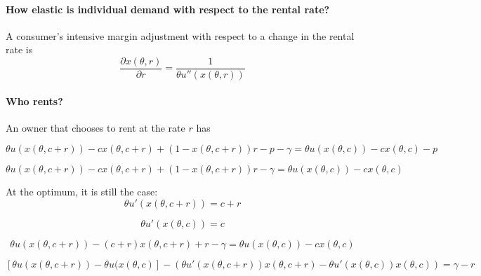 \documentclass[11pt]{article}
\begin{document}
\paragraph{How elastic is individual demand with respect to the rental rate?} 
A consumer's intensive margin adjustment with respect to a change in the rental rate is 
\begin{equation} 
\frac{\partial x(\theta, r)}{\partial r} = \frac{1}{\theta u''(x(\theta, r))}
\end{equation} 

\paragraph{Who rents?} 

An owner that chooses to rent at the rate $r$ has 

\begin{equation}
\theta u(x(\theta, c + r)) - c x(\theta, c + r) + (1-x(\theta, c+r))r
- p - \gamma =  
\theta u(x(\theta, c)) - c x(\theta, c) - p  
\end{equation} 

\begin{equation}
\theta u(x(\theta, c + r)) - c x(\theta, c + r) + (1-x(\theta, c+r))r - \gamma =  \theta u(x(\theta, c)) - c x(\theta, c)   
\end{equation} 


At the optimum, it is still the case: 
\begin{equation}
\theta u'(x(\theta, c + r)) = c + r
\end{equation} 

\begin{equation}
\theta u'(x(\theta, c)) = c
\end{equation} 

\begin{equation}
\theta u(x(\theta, c + r)) - (c + r) x(\theta, c + r) + r - \gamma =  \theta u(x(\theta, c)) - c x(\theta, c)   
\end{equation} 

\begin{equation}
\left[ \theta u(x(\theta, c + r)) - \theta u(x(\theta, c) \right] - \left( \theta u'(x(\theta, c + r)) x(\theta, c + r) - \theta u'(x(\theta, c)) x(\theta, c) \right) = \gamma  - r     
\end{equation} 


\begin{equation}
 
\end{equation} 
\end{document}
